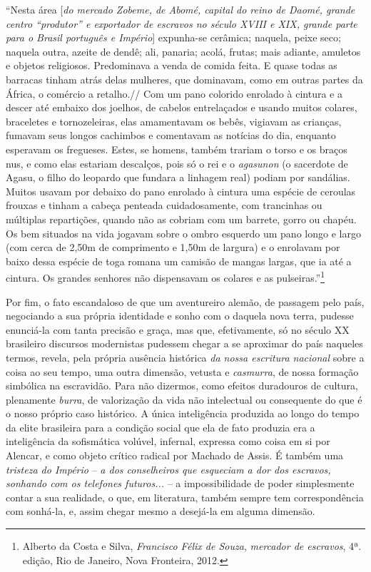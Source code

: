 ``Nesta área {[}\emph{do mercado Zobeme, de Abomé, capital do reino de
Daomé, grande centro ``produtor'' e exportador de escravos no século
XVIII e XIX, grande parte para o Brasil português e Império}{]}
expunha-se cerâmica; naquela, peixe seco; naquela outra, azeite de
dendê; ali, panaria; acolá, frutas; mais adiante, amuletos e objetos
religiosos. Predominava a venda de comida feita. E quase todas as
barracas tinham atrás delas mulheres, que dominavam, como em outras
partes da África, o comércio a retalho.// Com um pano colorido enrolado
à cintura e a descer até embaixo dos joelhos, de cabelos entrelaçados e
usando muitos colares, braceletes e tornozeleiras, elas amamentavam os
bebês, vigiavam as crianças, fumavam seus longos cachimbos e comentavam
as notícias do dia, enquanto esperavam os fregueses. Estes, se homens,
também trariam o torso e os braços nus, e como elas estariam descalços,
pois só o rei e o \emph{agasunon} (o sacerdote de Agasu, o filho do
leopardo que fundara a linhagem real) podiam por sandálias. Muitos
usavam por debaixo do pano enrolado à cintura uma espécie de ceroulas
frouxas e tinham a cabeça penteada cuidadosamente, com trancinhas ou
múltiplas repartições, quando não as cobriam com um barrete, gorro ou
chapéu. Os bem situados na vida jogavam sobre o ombro esquerdo um pano
longo e largo (com cerca de 2,50m de comprimento e 1,50m de largura) e o
enrolavam por baixo dessa espécie de toga romana um camisão de mangas
largas, que ia até a cintura. Os grandes senhores não dispensavam os
colares e as pulseiras.''\footnote{Alberto da Costa e Silva,
  \emph{Francisco Félix de Souza}, \emph{mercador de escravos}, 4ª.
  edição, Rio de Janeiro, Nova Fronteira, 2012.}

Por fim, o fato escandaloso de que um aventureiro alemão, de passagem
pelo país, negociando a sua própria identidade e sonho com o daquela
nova terra, pudesse enunciá-la com tanta precisão e graça, mas que,
efetivamente, só no século XX brasileiro discursos modernistas pudessem
chegar a se aproximar do país naqueles termos, revela, pela própria
ausência histórica \emph{da nossa escritura nacional} sobre a coisa ao
seu tempo, uma outra dimensão, vetusta e \emph{casmurra}, de nossa
formação simbólica na escravidão. Para não dizermos, como efeitos
duradouros de cultura, plenamente \emph{burra}, de valorização da vida
não intelectual ou consequente do que é o nosso próprio caso histórico.
A única inteligência produzida ao longo do tempo da elite brasileira
para a condição social que ela de fato produzia era a inteligência da
sofismática volúvel, infernal, expressa como coisa em si por Alencar, e
como objeto crítico radical por Machado de Assis. É também uma
\emph{tristeza do Império} -- \emph{a dos conselheiros que esqueciam a
dor dos escravos, sonhando com os telefones futuros...} -- a
impossibilidade de poder simplesmente contar a sua realidade, o que, em
literatura, também sempre tem correspondência com sonhá-la, e, assim
chegar mesmo a desejá-la em alguma dimensão.

